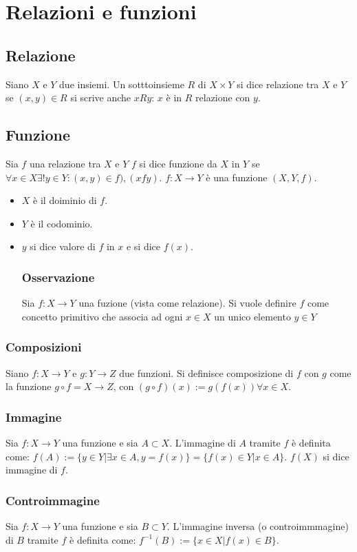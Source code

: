 \chapter{Relazioni e funzioni}
\section{Relazione}
Siano $X$ e $Y$ due insiemi. Un sotttoinsieme $R$ di $X\times Y$ si dice relazione tra $X$ e $Y$ se $(x,y)\in R$ si scrive anche $xRy$: $x$ \`e in $R$ relazione con $y$. 
\section{Funzione}
Sia $f$ una relazione tra $X$ e $Y$ $f$ si dice funzione da $X$ in $Y$ se $\forall x\in X\exists! y\in Y:(x,y)\in f), (xfy)$. $f:X\rightarrow Y$ \`e una funzione $(X,Y,f)$.
\begin{itemize}
\item $X$ \`e il doiminio di $f$.
\item $Y$ \`e il codominio.
\item $y$ si dice valore di $f$ in $x$ e si dice $f(x)$.
\subsection{Osservazione}
Sia $f:X\rightarrow Y$ una fuzione (vista come relazione). Si vuole definire $f$ come concetto primitivo che associa ad ogni $x\in X$ un unico elemento $y\in Y$
\end{itemize}
\subsection{Composizioni}
Siano $f:X\rightarrow Y$ e $g:Y\rightarrow Z$ due funzioni. Si definisce composizione di $f$ con $g$ come la funzione $g\circ f=X\rightarrow Z$, con $(g\circ f)(x):=g(f(x))
\forall x\in X$. 
\subsection{Immagine}
Sia $f:X\rightarrow Y$ una funzione e sia $A\subset X$. L'immagine di $A$ tramite $f$ \`e definita come: $f(A):=\{y\in Y|\exists x\in A, y=f(x)\}=\{f(x)\in Y|x\in A\}$. $f(X)$ si
dice immagine di $f$. 
\subsection{Controimmagine}
Sia $f:X\rightarrow Y$ una funzione e sia $B\subset Y$. L'immagine inversa (o controimmmagine) di $B$ tramite $f$ \`e definita come: $f^{-1}(B):=\{x\in X|f(x)\in B\}$.
